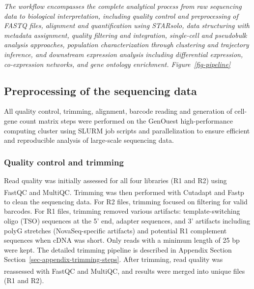 \documentclass[
  11pt,
  a4paper,
]{report}
\begin{document}
\emph{The workflow encompasses the complete analytical process from raw
sequencing data to biological interpretation, including quality control
and preprocessing of FASTQ files, alignment and quantification using
STARsolo, data structuring with metadata assignment, quality filtering
and integration, single-cell and pseudobulk analysis approaches,
population characterization through clustering and trajectory inference,
and downstream expression analysis including differential expression,
co-expression networks, and gene ontology enrichment.
Figure~\ref{fig-pipeline}}

\subsection{Preprocessing of the sequencing
data}\label{preprocessing-of-the-sequencing-data}

All quality control, trimming, alignment, barcode reading and generation
of cell-gene count matrix steps were performed on the GenOuest
high-performance computing cluster using SLURM job scripts and
parallelization to ensure efficient and reproducible analysis of
large-scale sequencing data.

\subsubsection{Quality control and
trimming}\label{quality-control-and-trimming}

Read quality was initially assessed for all four libraries (R1 and R2)
using FastQC\textsuperscript{} and
MultiQC\textsuperscript{}. Trimming was then
performed with Cutadapt\textsuperscript{}
and Fastp\textsuperscript{} to clean the
sequencing data. For R2 files, trimming focused on filtering for valid
barcodes. For R1 files, trimming removed various artifacts:
template-switching oligo (TSO) sequences at the 5' end, adapter
sequences, and 3' artifacts including polyG stretches (NovaSeq-specific
artifacts) and potential R1 complement sequences when cDNA was short.
Only reads with a minimum length of 25 bp were kept. The detailed
trimming pipeline is described in Appendix Section
Section~\ref{sec-appendix-trimming-steps}. After trimming, read quality
was reassessed with FastQC\textsuperscript{}
and MultiQC\textsuperscript{}, and results
were merged into unique files (R1 and R2).
\end{document}
